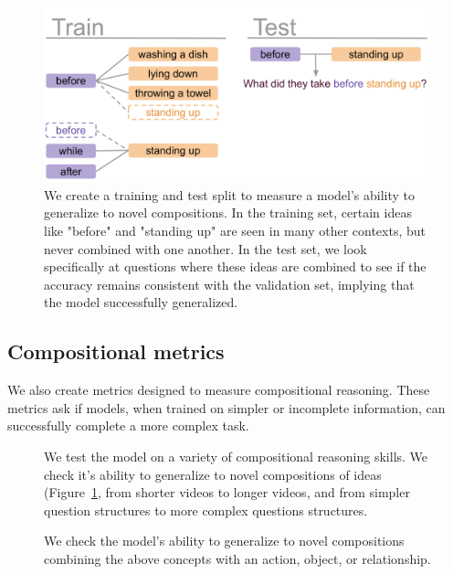 \documentclass[10pt,twocolumn,letterpaper]{article}
\begin{document}
\begin{figure}[t]
    \centering
    \includegraphics[width=0.95\linewidth]{figures/novel comp.pdf}
    \caption{We create a training and test split to measure a model's ability to generalize to novel compositions. In the training set, certain ideas like "before" and "standing up" are seen in many other contexts, but never combined with one another. In the test set, we look specifically at questions where these ideas are combined to see if the accuracy remains consistent with the validation set, implying that the model successfully generalized.}
    \label{fig:compo_fig}
\end{figure}



\subsection{Compositional metrics}

We also create metrics designed to measure compositional reasoning. These metrics ask if models, when trained on simpler or incomplete information, can successfully complete a more complex task.


\begin{figure}[t]
\begin{center}

\end{center}
    \caption{We test the model on a variety of compositional reasoning skills. We check it's ability to generalize to novel compositions of ideas (Figure~\ref{fig:compo_fig}, from shorter videos to longer videos, and from simpler question structures to more complex questions structures.}
    \label{table:compo}
\end{figure}


\begin{figure}[t]
\begin{center}
\resizebox{\linewidth}{!}{

}
\end{center}
   \caption{We check the model's ability to generalize to novel compositions combining the above concepts with an action, object, or relationship.}
\label{table:novel}
\end{figure}
\end{document}
